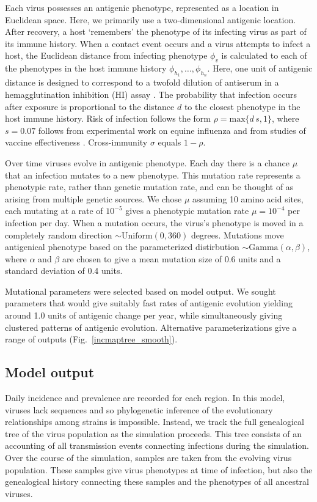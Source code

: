 \documentclass[11pt,oneside,letterpaper]{article}
\begin{document}
Each virus possesses an antigenic phenotype, represented as a location in Euclidean space.  Here, we primarily use a two-dimensional antigenic location.  After recovery, a host `remembers' the phenotype of its infecting virus as part of its immune history.  When a contact event occurs and a virus attempts to infect a host, the Euclidean distance from infecting phenotype $\phi_v$ is calculated to each of the phenotypes in the host immune history $\phi_{h_1}, \dots, \phi_{h_n}$.  Here, one unit of antigenic distance is designed to correspond to a twofold dilution of antiserum in a hemagglutination inhibition (HI) assay \cite{Smith04}. The probability that infection occurs after exposure is proportional to the distance $d$ to the closest phenotype in the host immune history.  Risk of infection follows the form $\rho = \textrm{max}\{d\,s,1\}$, where $s=0.07$ follows from experimental work on equine influenza \cite{Park09} and from studies of vaccine effectiveness \cite{Gupta06}.  Cross-immunity $\sigma$ equals $1-\rho$.

Over time viruses evolve in antigenic phenotype.  Each day there is a chance $\mu$ that an infection mutates to a new phenotype.  This mutation rate represents a phenotypic rate, rather than genetic mutation rate, and can be thought of as arising from multiple genetic sources.  We chose $\mu$ assuming 10 amino acid sites, each mutating at a rate of $10^{-5}$ \cite{Rambaut08} gives a phenotypic mutation rate $\mu = 10^{-4}$ per infection per day.  When a mutation occurs, the virus's phenotype is moved in a completely random direction $\sim \textrm{Uniform}(0,360)$ degrees. Mutations move antigenical phenotype based on the parameterized distirbution $\sim \textrm{Gamma}(\alpha,\beta)$, where $\alpha$ and $\beta$ are chosen to give a mean mutation size of 0.6 units and a standard deviation of 0.4 units.  

Mutational parameters were selected based on model output.  We sought parameters that would give suitably fast rates of antigenic evolution yielding around 1.0 units of antigenic change per year, while simultaneously giving clustered patterns of antigenic evolution.  Alternative parameterizations give a range of outputs (Fig.~\ref{incmaptree_smooth}).

\subsection*{Model output}

Daily incidence and prevalence are recorded for each region.  In this model, viruses lack sequences and so phylogenetic inference of the evolutionary relationships among strains is impossible.  Instead, we track the full genealogical tree of the virus population as the simulation proceeds.  This tree consists of an accounting of all transmission events connecting infections during the simulation.  Over the course of the simulation, samples are taken from the evolving virus population.  These samples give virus phenotypes at time of infection, but also the genealogical history connecting these samples and the phenotypes of all ancestral viruses.
\end{document}
